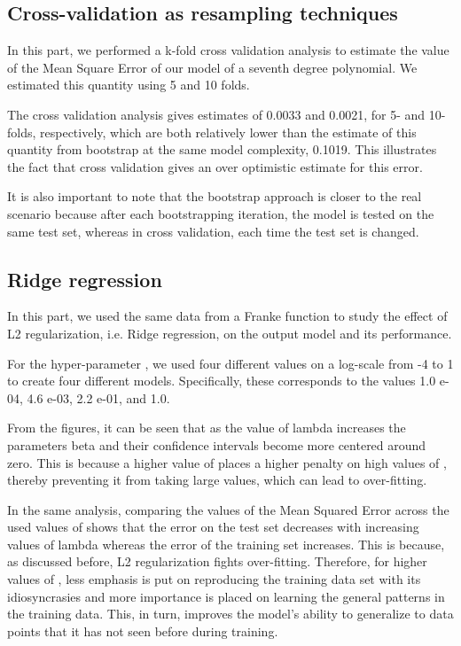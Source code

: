\documentclass{article}
\begin{document}
\subsection{Cross-validation as resampling techniques}
In this part, we performed a k-fold cross validation analysis to estimate the value of the Mean Square Error of our model of a seventh degree polynomial. We estimated this quantity using 5 and 10 folds.

The cross validation analysis gives estimates of 0.0033 and 0.0021, for 5- and 10-folds, respectively, which are both relatively lower than the estimate of this quantity from bootstrap at the same model complexity, 0.1019. This illustrates the fact that cross validation gives an over optimistic estimate for this error.

It is also important to note that the bootstrap approach is closer to the real scenario because after each bootstrapping iteration, the model is tested on the same test set, whereas in cross validation, each time the test set is changed.


\subsection{Ridge regression}
In this part, we used the same data from a Franke function to study the effect of L2 regularization, i.e. Ridge regression, on the output model and its performance.

For the hyper-parameter , we used four different values on a log-scale from -4 to 1 to create four different models. Specifically, these corresponds to the values 1.0 e-04, 4.6 e-03, 2.2 e-01, and 1.0.

From the figures, it can be seen that as the value of lambda increases the parameters beta and their confidence intervals become more centered around zero. This is because a higher value of  places a higher penalty on high values of , thereby preventing it from taking large values, which can lead to over-fitting.

In the same analysis, comparing the values of the Mean Squared Error across the used values of  shows that the error on the test set decreases with increasing values of lambda whereas the error of the training set increases. This is because, as discussed before, L2 regularization fights over-fitting. Therefore, for higher values of , less emphasis is put on reproducing the training data set with its idiosyncrasies and more importance is placed on learning the general patterns in the training data. This, in turn, improves the model’s ability to generalize to data points that it has not seen before during training.
\end{document}

